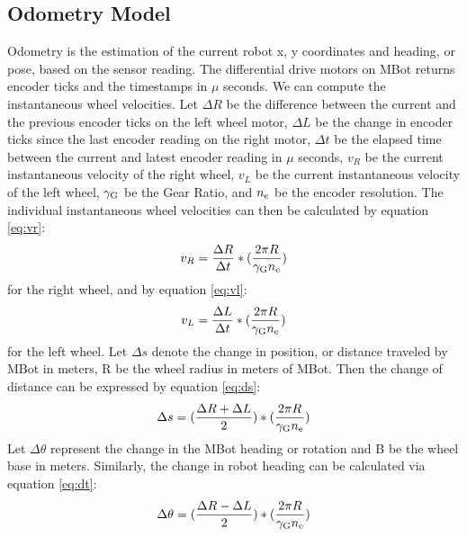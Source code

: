\documentclass[conference]{IEEEtran}
\begin{document}
\subsection{Odometry Model}
Odometry is the estimation of the current robot x, y coordinates and heading, or pose, based on the sensor reading. The differential drive motors on MBot returns encoder ticks and the timestamps in $\mu$ seconds. We can compute the instantaneous wheel velocities. Let $\Delta R$ be the difference between the current and the previous encoder ticks on the left wheel motor, $\Delta L$ be the change in encoder ticks since the last encoder reading on the right motor, $\Delta t$ be the elapsed time between the current and latest encoder reading in $\mu$ seconds, $v_R$ be the current instantaneous velocity of the right wheel, $v_L$ be the current instantaneous velocity of the left wheel, $\gamma_{\rm G}$ be the Gear Ratio, and $n_{\rm e}$ be the encoder resolution. The individual instantaneous wheel velocities can then be calculated by equation \ref{eq:vr}:
\begin{equation} \label{eq:vr}
v_R = \frac{\Delta R}{\Delta t} * (\frac{2\pi R}{\gamma_{\rm G}n_{\rm e}})
\end{equation} 
for the right wheel, and by equation \ref{eq:vl}:
\begin{equation} \label{eq:vl}
v_L = \frac{\Delta L}{\Delta t} * (\frac{2\pi R}{\gamma_{\rm G}n_{\rm e}})
\end{equation}
for the left wheel. Let $\Delta s$ denote the change in position, or distance traveled by MBot in meters, R be the wheel radius in meters of MBot. 
Then the change of distance can be expressed by equation \ref{eq:ds}: 
\begin{equation} \label{eq:ds}
\Delta s = (\frac{\Delta R + \Delta L}{2}) * (\frac{2\pi R}{\gamma_{\rm G}n_{\rm e}})
\end{equation}
Let $\Delta \theta$ represent the change in the MBot heading or rotation and B be the wheel base in meters. Similarly, the change in robot heading can be calculated via equation \ref{eq:dt}: 
\begin{equation} \label{eq:dt}
\Delta \theta = (\frac{\Delta R - \Delta L}{2}) * (\frac{2\pi R}{\gamma_{\rm G}n_{\rm e}})
\end{equation}
\end{document}
